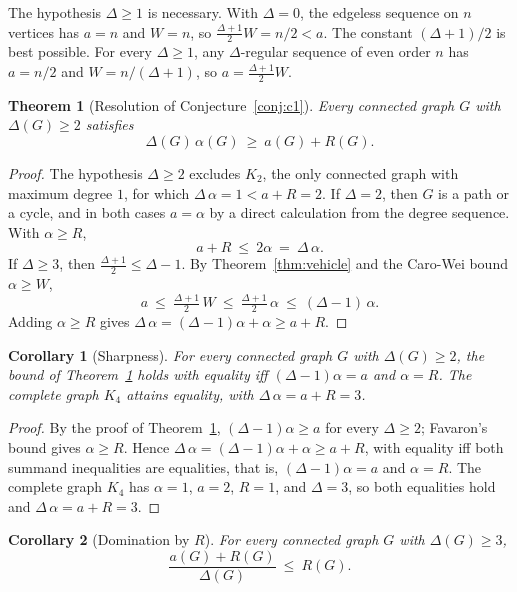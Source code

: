 \documentclass[11pt]{article}
\newtheorem{theorem}{Theorem}
\newtheorem{corollary}{Corollary}
\theoremstyle{remark}
\begin{document}
The hypothesis $\Delta \ge 1$ is necessary. With $\Delta = 0$, the edgeless
sequence on $n$ vertices has $a = n$ and $W = n$, so $\tfrac{\Delta+1}{2}W = n/2
< a$. The constant $(\Delta+1)/2$ is best possible. For every $\Delta \ge 1$,
any $\Delta$-regular sequence of even order $n$ has $a = n/2$ and
$W = n/(\Delta+1)$, so $a = \tfrac{\Delta+1}{2}W$.

\begin{theorem}[Resolution of Conjecture~\ref{conj:c1}]\label{thm:main}
Every connected graph $G$ with $\Delta(G) \ge 2$ satisfies
\[
  \Delta(G)\,\alpha(G) \ \ge\ a(G) + R(G).
\]
\end{theorem}

\begin{proof}
The hypothesis $\Delta \ge 2$ excludes $K_2$, the only connected graph with
maximum degree $1$, for which $\Delta\,\alpha = 1 < a + R = 2$.
If $\Delta = 2$, then $G$ is a path or a cycle, and in both cases $a = \alpha$
by a direct calculation from the degree sequence. With $\alpha \ge R$,
\[
  a + R \ \le\ 2\alpha \ =\ \Delta\,\alpha.
\]
If $\Delta \ge 3$, then $\tfrac{\Delta+1}{2} \le \Delta-1$. By
Theorem~\ref{thm:vehicle} and the Caro-Wei bound $\alpha \ge W$,
\[
  a \ \le\ \tfrac{\Delta+1}{2}\,W \ \le\ \tfrac{\Delta+1}{2}\,\alpha
    \ \le\ (\Delta-1)\,\alpha.
\]
Adding $\alpha \ge R$ gives $\Delta\,\alpha = (\Delta-1)\alpha
+ \alpha \ge a + R$.
\end{proof}

\begin{corollary}[Sharpness]\label{cor:sharp}
For every connected graph $G$ with $\Delta(G) \ge 2$, the bound of
Theorem~\ref{thm:main} holds with equality iff $(\Delta-1)\alpha = a$
and $\alpha = R$. The complete graph $K_4$ attains equality, with
$\Delta\,\alpha = a + R = 3$.
\end{corollary}

\begin{proof}
By the proof of Theorem~\ref{thm:main}, $(\Delta-1)\alpha \ge a$ for every
$\Delta \ge 2$; Favaron's bound gives $\alpha \ge R$. Hence
$\Delta\,\alpha = (\Delta-1)\alpha + \alpha \ge a + R$, with equality iff
both summand inequalities are equalities, that is, $(\Delta-1)\alpha = a$ and
$\alpha = R$. The complete graph $K_4$ has $\alpha = 1$, $a = 2$, $R = 1$, and
$\Delta = 3$, so both equalities hold and $\Delta\,\alpha = a + R = 3$.
\end{proof}

\begin{corollary}[Domination by $R$]\label{cor:dominated}
For every connected graph $G$ with $\Delta(G) \ge 3$,
\[
  \frac{a(G) + R(G)}{\Delta(G)} \ \le\ R(G).
\]
\end{corollary}
\end{document}
